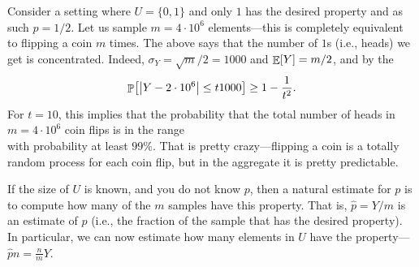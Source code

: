 \begin{example}
    Consider a setting where $U = \{ 0,1 \}$ and only $1$ has the desired
    property and as such $p=1/2$. Let us sample $m=4\cdot 10^6$ elements---this
    is completely equivalent to flipping a coin $m$ times. The above says
    that the number of $1$s (i.e., heads) we get is concentrated. Indeed,
    $\sigma_Y = \sqrt{m}/2 = 1000$ and $\mathop{\mathbb{E}}\!\left[ {Y} \right]=m/2$, and by the 
    \begin{equation*}
        \Prob{ \cardin{Y - 2\cdot 10^6} \leq t 1000 }
        \geq 1 - \frac{1}{t^2}.
    \end{equation*}
    For $t=10$, this implies that the probability that the total number
    of heads in $m=4\cdot 10^6$ coin flips is in the range
    \begin{equation*}
        [2,000,000 - 10,000, 2,000,000 + 10,000]
    \end{equation*}
    with probability at least $99\%$. That is pretty crazy---flipping a
    coin is a totally random process for each coin flip, but in the
    aggregate it is pretty predictable.
\end{example}

\begin{example}
    If the size of $U$ is known, and you do not know $p$, then a natural
    estimate for $p$ is to compute how many of the $m$ samples have this
    property.  That is, $\widehat{p} = Y/m$ is an estimate of $p$ (i.e.,
    the fraction of the sample that has the desired property). In
    particular, we can now estimate how many elements in $U$ have the
    property--- $\widehat{p} n = \tfrac{n}{m} Y$.
\end{example}


